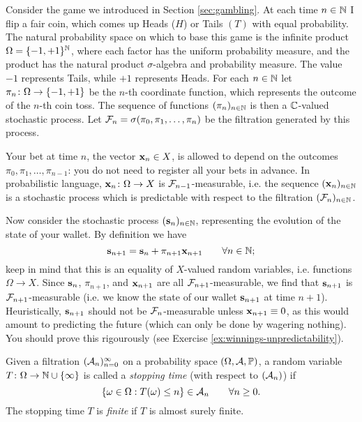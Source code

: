 \begin{example}\label{eg:gambling-filtrations}
  Consider the game we introduced in Section \ref{sec:gambling}.
  At each time $n \in \mathbb{N}$ I flip a fair coin, which comes up Heads ($H$) or Tails $(T)$ with equal probability.
  The natural probability space on which to base this game is the infinite product $\Omega = \{-1,+1\}^{\mathbb{N}}$, where each factor has the uniform probability measure, and the product has the natural product $\sigma$-algebra and probability measure.
  The value $-1$ represents Tails, while $+1$ represents Heads.
  For each $n \in \mathbb{N}$ let $\pi_n \colon \Omega \rightarrow \{-1,+1\}$ be the $n$-th coordinate function, which represents the outcome of the $n$-th coin toss.
  The sequence of functions $(\pi_n)_{n \in \mathbb{N}}$ is then a $\mathbb{C}$-valued stochastic process.
  Let $\mathcal{F}_n = \sigma(\pi_0,\pi_1,\ldots,\pi_n)$ be the filtration generated by this process.

  
  Your bet at time $n$, the vector $\mathbf{x}_n \in X$, is allowed to depend on the outcomes $\pi_0, \pi_1, \ldots, \pi_{n-1}$: you do not need to register all your bets in advance.
  In probabilistic language, $\mathbf{x}_n \colon \Omega \rightarrow X$ is $\mathcal{F}_{n-1}$-measurable, i.e. the sequence $(\mathbf{x}_n)_{n \in \mathbb{N}}$ is a stochastic process which is predictable with respect to the filtration $(\mathcal{F}_n)_{n \in \mathbb{N}}$.

  Now consider the stochastic process $(\mathbf{s}_n)_{n \in \mathbb{N}}$, representing the evolution of the state of your wallet.
  By definition we have
  \begin{equation*}
    \mathbf{s}_{n+1} = \mathbf{s}_n + \pi_{n+1} \mathbf{x}_{n+1} \qquad \forall n \in \mathbb{N};
  \end{equation*}
  keep in mind that this is an equality of $X$-valued random variables, i.e. functions $\Omega \to X$.
  Since $\mathbf{s}_n$, $\pi_{n+1}$, and $\mathbf{x}_{n+1}$ are all $\mathcal{F}_{n+1}$-measurable, we find that $\mathbf{s}_{n+1}$ is $\mathcal{F}_{n+1}$-measurable (i.e. we know the state of our wallet $\mathbf{s}_{n+1}$ at time $n+1$).
  Heuristically, $\mathbf{s}_{n+1}$ should not be $\mathcal{F}_n$-measurable unless $\mathbf{x}_{n+1} \equiv 0$, as this would amount to predicting the future (which can only be done by wagering nothing).
  You should prove this rigourously (see Exercise \ref{ex:winnings-unpredictability}).
\end{example}


\begin{defn}
  Given a filtration $(\mathcal{A}_n)_{n=0}^\infty$ on a probability space $(\Omega, \mathcal{A}, \mathbb{P})$, a random variable $T \colon \Omega \rightarrow \mathbb{N} \cup \{\infty\}$ is called a \emph{stopping time} (with respect to $(\mathcal{A}_n)$) if 
  \begin{equation*}
    \{\omega \in \Omega: T(\omega) \leq n\} \in \mathcal{A}_n \qquad \forall n \geq 0.
  \end{equation*}
  The stopping time $T$ is \emph{finite} if $T$ is almost surely finite.
\end{defn}

